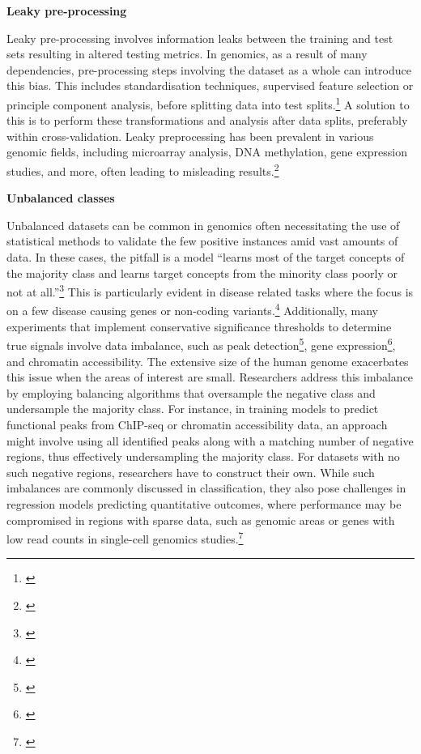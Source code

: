 \documentclass[
]{book}
\begin{document}
\textbf{Leaky pre-processing}

Leaky pre-processing involves information leaks between the training and test sets resulting in altered testing metrics. In genomics, as a result of many dependencies, pre-processing steps involving the dataset as a whole can introduce this bias. This includes standardisation techniques, supervised feature selection or principle component analysis, before splitting data into test splits.\footnote{\citet{whalen2022}} A solution to this is to perform these transformations and analysis after data splits, preferably within cross-validation. Leaky preprocessing has been prevalent in various genomic fields, including microarray analysis, DNA methylation, gene expression studies, and more, often leading to misleading results.\footnote{\citet{whalen2022}}

\textbf{Unbalanced classes}

Unbalanced datasets can be common in genomics often necessitating the use of statistical methods to validate the few positive instances amid vast amounts of data. In these cases, the pitfall is a model ``learns most of the target concepts of the majority class and learns target concepts from the minority class poorly or not at all.''\footnote{\citet{muk2014}} This is particularly evident in disease related tasks where the focus is on a few disease causing genes or non-coding variants.\footnote{\citet{muk2014}} Additionally, many experiments that implement conservative significance thresholds to determine true signals involve data imbalance, such as peak detection\footnote{\citet{oh2020}}, gene expression\footnote{\citet{avsec2021}}, and chromatin accessibility. The extensive size of the human genome exacerbates this issue when the areas of interest are small. Researchers address this imbalance by employing balancing algorithms that oversample the negative class and undersample the majority class. For instance, in training models to predict functional peaks from ChIP-seq or chromatin accessibility data, an approach might involve using all identified peaks along with a matching number of negative regions, thus effectively undersampling the majority class. For datasets with no such negative regions, researchers have to construct their own. While such imbalances are commonly discussed in classification, they also pose challenges in regression models predicting quantitative outcomes, where performance may be compromised in regions with sparse data, such as genomic areas or genes with low read counts in single-cell genomics studies.\footnote{\citet{whalen2022}}
\end{document}
